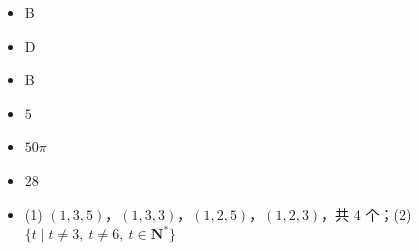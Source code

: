 \begin{itemize}[leftmargin=2.6em]
  \item[\textbf{30.}] B
  \item[\textbf{31.}] D
  \item[\textbf{32.}] B
  \item[\textbf{33.}] \(5\)
  \item[\textbf{34.}] \(50\pi\)
  \item[\textbf{35.}] \(28\)
  \item[\textbf{36.}] (1) \((1,3,5)\)，\((1,3,3)\)，\((1,2,5)\)，\((1,2,3)\)，共 4 个；(2) \(\{t\mid t\neq 3,\ t\neq 6,\ t\in\mathbf{N}^{\ast}\}\)
\end{itemize}
